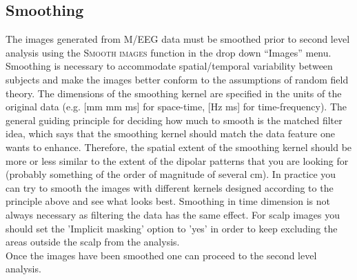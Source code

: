 \subsection{Smoothing}
The images generated from M/EEG data must be smoothed prior to second level analysis using the \textsc{Smooth images} function in the drop down ``Images'' menu. Smoothing is necessary to accommodate spatial/temporal variability between subjects and make the images better conform to the assumptions of random field theory. The dimensions of the smoothing kernel are specified in the units of the original data (e.g. [mm mm ms] for space-time, [Hz ms] for time-frequency). The general guiding principle for deciding how much to smooth is the matched filter idea, which says that the smoothing kernel should match the data feature one wants to enhance. Therefore, the spatial extent of the smoothing kernel should be more or less similar to the extent of the dipolar patterns that you are looking for (probably something of the order of magnitude of several cm).  In practice you can try to smooth the images with different kernels designed according to the principle above and see what looks best. Smoothing in time dimension is not always necessary as filtering the data has the same effect. For scalp images you should set the 'Implicit masking' option to 'yes' in order to keep excluding the areas outside the scalp from the analysis.
\\

Once the images have been smoothed one can proceed to the second level analysis.
